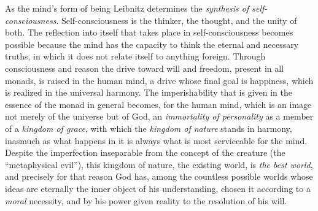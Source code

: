 As the mind's form of being Leibnitz determines the \emph{synthesis of
self-consciousness}. Self-consciousness is the thinker, the thought, and
the unity of both. The reflection into itself that takes place in
self-consciousness becomes possible because the mind has the capacity
to think the eternal and necessary truths, in which it does not relate
itself to anything foreign. Through consciousness and reason the drive
toward will and freedom, present in all monads, is raised in the human
mind, a drive whose final goal is happiness, which is
realized in the universal harmony. The imperishability that is given in
the essence of the monad in general becomes, for the human mind, which
is an image not merely of the universe but of God, an \emph{immortality
of personality} as a member of a \emph{kingdom of grace}, with which the
\emph{kingdom of nature} stands in harmony, inasmuch as what happens in
it is always what is most serviceable for the mind. Despite the
imperfection inseparable from the concept of the creature (the
``metaphysical evil''), this kingdom of nature, the existing world, is
\emph{the best world}, and precisely for that reason God has, among the
countless possible worlds whose ideas are eternally the inner object of
his understanding, chosen it according to a \emph{moral} necessity, and
by his power given reality to the resolution of his will.

\divrule

